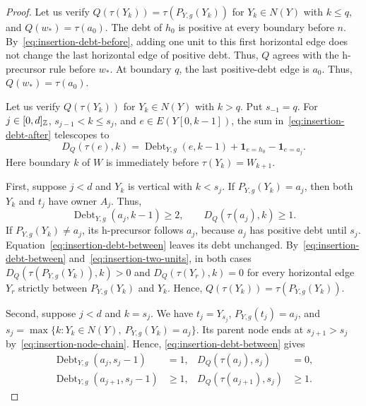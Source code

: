 \begin{proof}
Let us verify $Q(\tau(Y_k))=\tau(P_{Y,g}(Y_k))$ for $Y_k\in N(Y)$ with $k\le q$, and $Q(w_*)=\tau(a_0)$. The debt of $h_0$ is positive at every boundary before $n$. By~\eqref{eq:insertion-debt-before}, adding one unit to this first horizontal edge does not change the last horizontal edge of positive debt. Thus, $Q$ agrees with the h-precursor rule before $w_*$. At boundary $q$, the last positive-debt edge is $a_0$. Thus, $Q(w_*)=\tau(a_0)$.

Let us verify $Q(\tau(Y_k))$ for $Y_k\in N(Y)$ with $k>q$. Put $s_{-1}=q$. For $j\in[0,d]_{\mathbb Z}$, $s_{j-1}<k\le s_j$, and $e\in E(Y[0,k-1])$, the sum in~\eqref{eq:insertion-debt-after} telescopes to
\begin{equation}\label{eq:insertion-debt-between}
 D_Q(\tau(e),k)
 =\operatorname{Debt}_{Y,g}(e,k-1)+\mathbf1_{e=h_0}-\mathbf1_{e=a_j}.
\end{equation}
Here boundary $k$ of $W$ is immediately before $\tau(Y_k)=W_{k+1}$.

First, suppose $j<d$ and $Y_k$ is vertical with $k<s_j$. If $P_{Y,g}(Y_k)=a_j$, then both $Y_k$ and $t_j$ have owner $A_j$. Thus,
\begin{equation}\label{eq:insertion-two-units}
 \operatorname{Debt}_{Y,g}(a_j,k-1)\ge2,
 \qquad D_Q(\tau(a_j),k)\ge1.
\end{equation}
If $P_{Y,g}(Y_k)\ne a_j$, its h-precursor follows $a_j$, because $a_j$ has positive debt until $s_j$. Equation~\eqref{eq:insertion-debt-between} leaves its debt unchanged. By~\eqref{eq:insertion-debt-between} and~\eqref{eq:insertion-two-units}, in both cases $D_Q(\tau(P_{Y,g}(Y_k)),k)>0$ and $D_Q(\tau(Y_r),k)=0$ for every horizontal edge $Y_r$ strictly between $P_{Y,g}(Y_k)$ and $Y_k$. Hence, $Q(\tau(Y_k))=\tau(P_{Y,g}(Y_k))$.

Second, suppose $j<d$ and $k=s_j$. We have $t_j=Y_{s_j}$, $P_{Y,g}(t_j)=a_j$, and $s_j=\max\{k:Y_k\in N(Y),\ P_{Y,g}(Y_k)=a_j\}$. Its parent node ends at $s_{j+1}>s_j$ by~\eqref{eq:insertion-node-chain}. Hence, \eqref{eq:insertion-debt-between} gives
\begin{equation}\label{eq:insertion-ending-debts}
\begin{aligned}
 \operatorname{Debt}_{Y,g}(a_j,s_j-1)&=1,
 &D_Q(\tau(a_j),s_j)&=0,\\
 \operatorname{Debt}_{Y,g}(a_{j+1},s_j-1)&\ge1,
 &D_Q(\tau(a_{j+1}),s_j)&\ge1.
\end{aligned}
\end{equation}


\end{proof}

